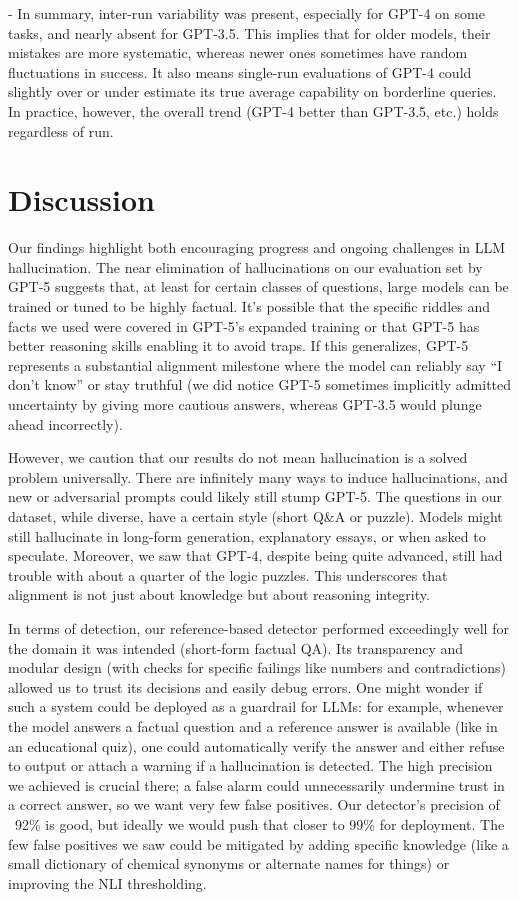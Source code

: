 \documentclass{article}
\begin{document}
- In summary, inter-run variability was present, especially for GPT-4 on some tasks, and nearly absent for GPT-3.5. This implies that for older models, their mistakes are more systematic, whereas newer ones sometimes have random fluctuations in success. It also means single-run evaluations of GPT-4 could slightly over or under estimate its true average capability on borderline queries. In practice, however, the overall trend (GPT-4 better than GPT-3.5, etc.) holds regardless of run.

\section{Discussion}\label{sec:discussion}
Our findings highlight both encouraging progress and ongoing challenges in LLM hallucination. The near elimination of hallucinations on our evaluation set by GPT-5 suggests that, at least for certain classes of questions, large models can be trained or tuned to be highly factual. It’s possible that the specific riddles and facts we used were covered in GPT-5’s expanded training or that GPT-5 has better reasoning skills enabling it to avoid traps. If this generalizes, GPT-5 represents a substantial alignment milestone where the model can reliably say “I don’t know” or stay truthful (we did notice GPT-5 sometimes implicitly admitted uncertainty by giving more cautious answers, whereas GPT-3.5 would plunge ahead incorrectly).

However, we caution that our results do not mean hallucination is a solved problem universally. There are infinitely many ways to induce hallucinations, and new or adversarial prompts could likely still stump GPT-5. The questions in our dataset, while diverse, have a certain style (short Q&A or puzzle). Models might still hallucinate in long-form generation, explanatory essays, or when asked to speculate. Moreover, we saw that GPT-4, despite being quite advanced, still had trouble with about a quarter of the logic puzzles. This underscores that alignment is not just about knowledge but about reasoning integrity.

In terms of detection, our reference-based detector performed exceedingly well for the domain it was intended (short-form factual QA). Its transparency and modular design (with checks for specific failings like numbers and contradictions) allowed us to trust its decisions and easily debug errors. One might wonder if such a system could be deployed as a guardrail for LLMs: for example, whenever the model answers a factual question and a reference answer is available (like in an educational quiz), one could automatically verify the answer and either refuse to output or attach a warning if a hallucination is detected. The high precision we achieved is crucial there; a false alarm could unnecessarily undermine trust in a correct answer, so we want very few false positives. Our detector's precision of ~92\% is good, but ideally we would push that closer to 99\% for deployment. The few false positives we saw could be mitigated by adding specific knowledge (like a small dictionary of chemical synonyms or alternate names for things) or improving the NLI thresholding.
\end{document}
